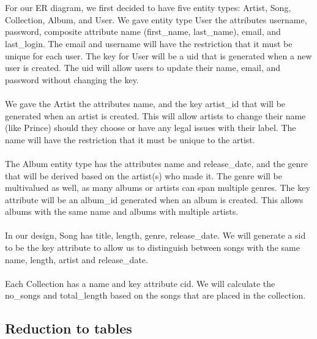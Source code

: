 \documentclass[12pt]{article}
\begin{document}
    \\~\\
    For our ER diagram, we first decided to have five entity types:
    Artist, Song, Collection, Album, and User. We gave entity type User the attributes
    username, password, composite attribute name (first\_name, last\_name), email, and
    last\_login. The email and username will have the restriction that it must be unique
    for each user. The key for User will be a uid that is generated when a new user is
    created. The uid will allow users to update their name, email, and password without
    changing the key.
    \\~\\
    We gave the Artist the attributes name, and the key artist\_id that
    will be generated when an artist is created. This will allow artists to change their
    name (like Prince) should they choose or have any legal issues with their label. The
    name will have the restriction that it must be unique to the artist.
    \\~\\
    The Album entity type has the attributes name and release\_date, and the
    genre that will be derived based on the artist(s) who made it. The genre will be
    multivalued as well, as many albums or artists can span multiple genres. The key
    attribute will be an album\_id generated when an album is created. This allows albums
    with the same name and albums with multiple artists.
    \\~\\
    In our design, Song has title, length, genre, release\_date. We will
    generate a sid to be the key attribute to allow us to distinguish between songs with
    the same name, length, artist and release\_date.
    \\~\\
    Each Collection has a name and key attribute cid. We will calculate
    the no\_songs and total\_length based on the songs that are placed in the collection.

    \subsection{Reduction to tables}
\end{document}
